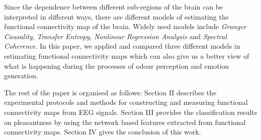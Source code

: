Since the dependence between different sub-regions of the brain can be interpreted in different ways, there are different models of estimating the functional connectivity map of the brain. Widely used models include \emph{Granger Causality}, \emph{Transfer Entropy}, \emph{Nonlinear Regression Analysis} and \emph{Spectral Coherence}. In this paper, we applied and compared three different models in estimating functional connectivity maps which can also give us a better view of what is happening during the processes of odour perception and emotion generation. 

The rest of the paper is organised as follows: Section II describes the experimental protocols and methods for constructing and measuring functional connectivity maps from EEG signals. Section III provides the classification results on pleasantness by using the network based features extracted from functional connectivity maps. Section IV gives the conclusion of this work. 
